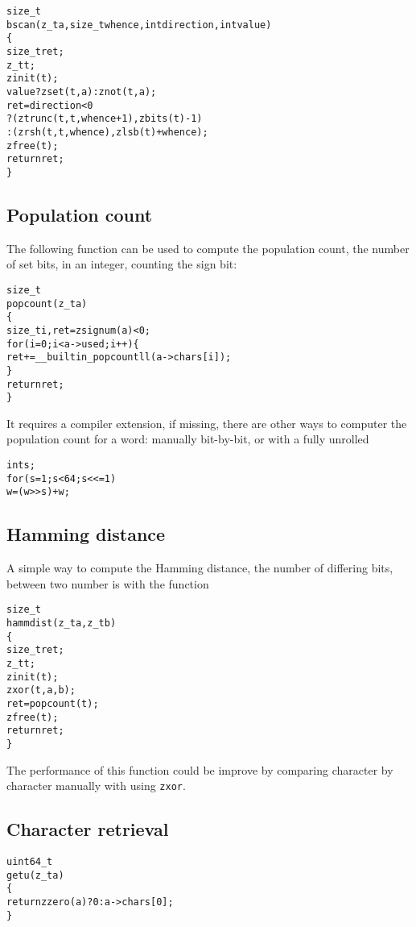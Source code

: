\begin{alltt}
   size_t
   bscan(z_t a, size_t whence, int direction, int value)
   \{
       size_t ret;
       z_t t;
       zinit(t);
       value ? zset(t, a) : znot(t, a);
       ret = direction < 0
           ? (ztrunc(t, t, whence + 1), zbits(t) - 1)
           : (zrsh(t, t, whence), zlsb(t) + whence);
       zfree(t);
       return ret;
   \}
\end{alltt}


\subsection{Population count}
\label{sec:Population count}

The following function can be used to compute
the population count, the number of set bits,
in an integer, counting the sign bit:

\begin{alltt}
   size_t
   popcount(z_t a)
   \{
       size_t i, ret = zsignum(a) < 0;
       for (i = 0; i < a->used; i++) \{
           ret += __builtin_popcountll(a->chars[i]);
       \}
       return ret;
   \}
\end{alltt}

\noindent
It requires a compiler extension, if missing,
there are other ways to computer the population
count for a word: manually bit-by-bit, or with
a fully unrolled

\begin{alltt}
   int s;
   for (s = 1; s < 64; s <<= 1)
       w = (w >> s) + w;
\end{alltt}


\subsection{Hamming distance}
\label{sec:Hamming distance}

A simple way to compute the Hamming distance,
the number of differing bits, between two number
is with the function

\begin{alltt}
   size_t
   hammdist(z_t a, z_t b)
   \{
       size_t ret;
       z_t t;
       zinit(t);
       zxor(t, a, b);
       ret = popcount(t);
       zfree(t);
       return ret;
   \}
\end{alltt}

\noindent
The performance of this function could
be improve by comparing character by
character manually with using {\tt zxor}.


\subsection{Character retrieval}
\label{sec:Character retrieval}

\begin{alltt}
uint64_t
getu(z_t a)
\{
    return zzero(a) ? 0 : a->chars[0];
\}
\end{alltt}

